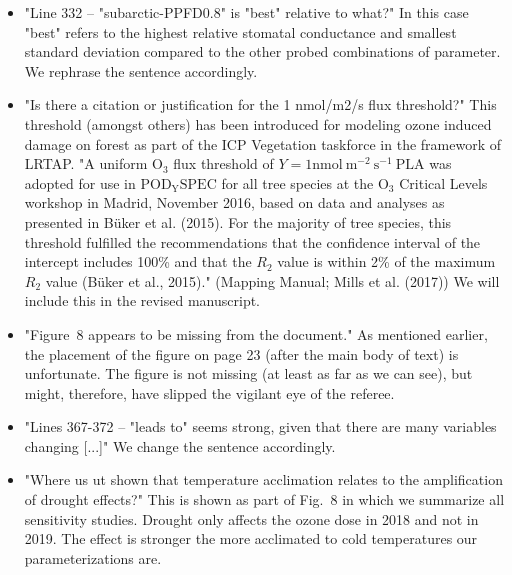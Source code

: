 \documentclass{scrartcl}
\begin{document}
\begin{itemize}
    \item {\color{blue} "Line 332 -- "subarctic-PPFD0.8" is "best" relative to what?"} In this case "best" refers to the highest relative stomatal conductance and smallest standard deviation compared to the other probed combinations of parameter. We rephrase the sentence accordingly.
    \item {\color{blue}"Is there a citation or justification for the 1 nmol/m2/s flux threshold?"} This threshold (amongst others) has been introduced for modeling ozone induced damage on forest as part of the ICP Vegetation taskforce in the framework of LRTAP. "A uniform $\mathrm{O_3}$ flux threshold of $Y=1 \mathrm{nmol~m^{-2}~s^{-1}~PLA}$ was adopted for use in $\mathrm{POD_Y SPEC}$ for all tree species at the $\mathrm{O_3}$ Critical Levels workshop in Madrid, November 2016, based on data and analyses as presented in Büker et al. (2015). For the majority of tree species, this threshold fulfilled the recommendations that the confidence interval of the intercept includes 100\% and that the $R_2$ value is within 2\% of the maximum $R_2$ value (Büker et al., 2015)." (Mapping Manual; Mills et al. (2017)) We will include this in the revised manuscript.
    \item {\color{blue}"Figure~8 appears to be missing from the document."} As mentioned earlier, the placement of the figure on page 23 (after the main body of text) is unfortunate. The figure is not missing (at least as far as we can see), but might, therefore, have slipped the vigilant eye of the referee.
    \item {\color{blue}"Lines 367-372 -- "leads to" seems strong, given that there are many variables changing [...]"} We change the sentence accordingly.
    \item {\color{blue}"Where us ut shown that temperature acclimation relates to the amplification of drought effects?"} This is shown as part of Fig.~8 in which we summarize all sensitivity studies. Drought only affects the ozone dose in 2018 and not in 2019. The effect is stronger the more acclimated to cold temperatures our parameterizations are.

\end{itemize}
\end{document}
